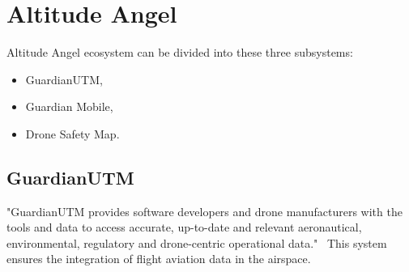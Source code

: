 \section{Altitude Angel}\label{sec:altitude-angel}
Altitude Angel ecosystem can be divided into these three subsystems:
\begin{itemize}
    \item GuardianUTM,
    \item Guardian Mobile,
    \item Drone Safety Map.
\end{itemize}

\subsection{GuardianUTM}\label{subsec:guardianutm}
"GuardianUTM provides software developers and drone manufacturers with the tools and data to access accurate, up-to-date and relevant aeronautical, environmental, regulatory and drone-centric operational data."~\cite{altitudeAngel}
This system ensures the integration of flight aviation data in the airspace.


